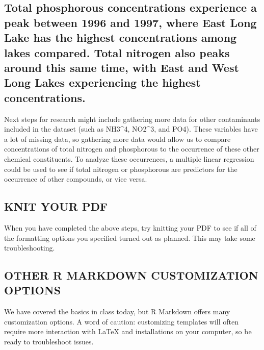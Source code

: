 \documentclass[]{article}
\begin{document}
\hypertarget{total-phosphorous-concentrations-experience-a-peak-between-1996-and-1997-where-east-long-lake-has-the-highest-concentrations-among-lakes-compared.-total-nitrogen-also-peaks-around-this-same-time-with-east-and-west-long-lakes-experiencing-the-highest-concentrations.}{%
\subsection{Total phosphorous concentrations experience a peak between
1996 and 1997, where East Long Lake has the highest concentrations among
lakes compared. Total nitrogen also peaks around this same time, with
East and West Long Lakes experiencing the highest
concentrations.}\label{total-phosphorous-concentrations-experience-a-peak-between-1996-and-1997-where-east-long-lake-has-the-highest-concentrations-among-lakes-compared.-total-nitrogen-also-peaks-around-this-same-time-with-east-and-west-long-lakes-experiencing-the-highest-concentrations.}}

Next steps for research might include gathering more data for other
contaminants included in the dataset (such as NH3\^{}4, NO2\^{}3, and
PO4). These variables have a lot of missing data, so gathering more data
would allow us to compare concentrations of total nitrogen and
phosphorous to the occurrence of these other chemical constituents. To
analyze these occurrences, a multiple linear regression could be used to
see if total nitrogen or phosphorous are predictors for the occurrence
of other compounds, or vice versa.

\hypertarget{knit-your-pdf}{%
\subsection{KNIT YOUR PDF}\label{knit-your-pdf}}

When you have completed the above steps, try knitting your PDF to see if
all of the formatting options you specified turned out as planned. This
may take some troubleshooting.

\hypertarget{other-r-markdown-customization-options}{%
\subsection{OTHER R MARKDOWN CUSTOMIZATION
OPTIONS}\label{other-r-markdown-customization-options}}

We have covered the basics in class today, but R Markdown offers many
customization options. A word of caution: customizing templates will
often require more interaction with LaTeX and installations on your
computer, so be ready to troubleshoot issues.
\end{document}
